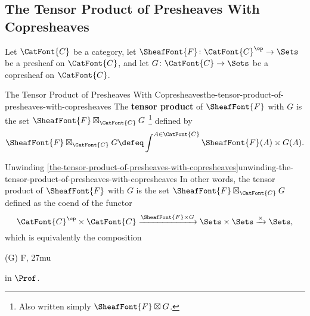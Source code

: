 \subsection{The Tensor Product of Presheaves With Copresheaves}\label{subsection-the-tensor-product-of-presheaves-with-copresheaves}
Let $\CatFont{C}$ be a category, let $\SheafFont{F}\colon\CatFont{C}^{\op}\to\Sets$ be a presheaf on $\CatFont{C}$, and let $G\colon\CatFont{C}\to\Sets$ be a copresheaf on $\CatFont{C}$.
\begin{definition}{The Tensor Product of Presheaves With Copresheaves}{the-tensor-product-of-presheaves-with-copresheaves}%
    The \textbf{tensor product} of $\SheafFont{F}$ with $G$ is the set $\SheafFont{F}\boxtimes_{\CatFont{C}}G$%
    \footnote{%
        Also written simply $\SheafFont{F}\boxtimes G$.
        \par\vspace*{-1.75\baselineskip}
    } %
    defined by
    \[
        \SheafFont{F}\boxtimes_{\CatFont{C}}G%
        \defeq%
        \int^{A\in\CatFont{C}}\SheafFont{F}(A)\times G(A).%
    \]%
\end{definition}
\begin{remark}{Unwinding \cref{the-tensor-product-of-presheaves-with-copresheaves}}{unwinding-the-tensor-product-of-presheaves-with-copresheaves}%
    In other words, the tensor product of $\SheafFont{F}$ with $G$ is the set $\SheafFont{F}\boxtimes_{\CatFont{C}}G$ defined as the coend of the functor
    \[
        \CatFont{C}^{\op}\times\CatFont{C}%
        \xrightarrow{\SheafFont{F}\times G}%
        \Sets\times\Sets%
        \xrightarrow{\times}%
        \Sets,%
    \]%
    which is equivalently the composition
    \begin{webcompile}
        \mathord{\times}\circ(\times G)%
        \cong%
        \procirc F,%
        \mkern27mu%
    \end{webcompile}
    in $\Prof$.
\end{remark}
